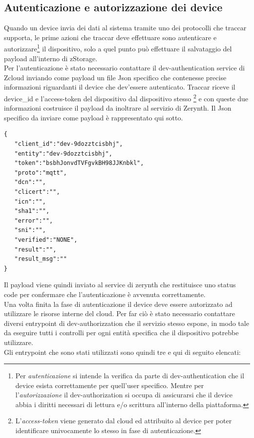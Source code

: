 \documentclass[a4paper,titlepage,12pt]{book}
\begin{document}
{\subsection{
Autenticazione e autorizzazione dei device}
Quando un device invia dei dati al sistema tramite uno dei protocolli che traccar supporta, le prime azioni che traccar deve effettuare sono autenticare e autorizzare\footnote{
Per \textit{autenticazione} si intende la verifica da parte di dev-authentication che il device esista correttamente per quell'user specifico. Mentre per l'\textit{autorizzazione} il dev-authorization si occupa di assicurarsi che il device abbia i diritti necessari di lettura e/o scrittura all'interno della piattaforma.} il dispositivo, solo a quel punto può effettuare il salvataggio del payload all'interno di zStorage.\\
Per l'autenticazione è stato necessario contattare il dev-authentication service di Zcloud inviando come payload un file Json specifico che contenesse precise informazioni riguardanti il device che dev'essere autenticato. Traccar riceve il device\_id e l'access-token del dispositivo dal dispositivo stesso \footnote{
L'\textit{access-token} viene generato dal cloud ed attribuito al device per poter identificare univocamente lo stesso in fase di autenticazione.} e con queste due informazioni costruisce il payload da inoltrare al servizio di Zerynth. Il Json specifico da inviare come payload è rappresentato qui sotto.


\begin{verbatim}
{
   "client_id":"dev-9dozztcisbhj",
   "entity":"dev-9dozztcisbhj",
   "token":"bsbhJonvdTVFgvkBH98JJKnbkl",
   "proto":"mqtt",
   "dcn":"",
   "clicert":"",
   "icn":"",
   "sha1":"",
   "error":"",
   "sni":"",
   "verified":"NONE",
   "result":"",
   "result_msg":""
}

\end{verbatim}

\noindent Il payload viene quindi inviato al service di zerynth che restituisce uno status code per confermare che l'autenticazione è avvenuta correttamente.\\
Una volta finita la fase di autenticazione il device deve essere autorizzato ad utilizzare le risorse interne del cloud. Per far ciò è stato necessario contattare diversi entrypoint di dev-authorizzation che il servizio stesso espone, in modo tale da eseguire tutti i controlli per ogni entità specifica che il dispositivo potrebbe utilizzare.
\\Gli entrypoint che sono stati utilizzati sono quindi tre e qui di seguito elencati:

}
\end{document}
